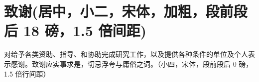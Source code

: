 \chapter{致谢(居中，小二，宋体，加粗，段前段后 18 磅，1.5 倍间距)}
对给予各类资助、指导、和协助完成研究工作，以及提供各种条件的单位及个人表示感谢。致谢应实事求是，切忌浮夸与庸俗之词。（小四，宋体，段前段后 0 磅，1.5 倍行间距）